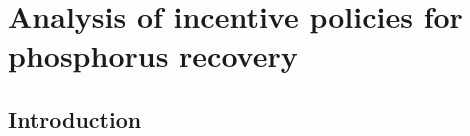 \chapter{Analysis of incentive policies for phosphorus recovery}\label{ch:Policies}
\section{Introduction}
